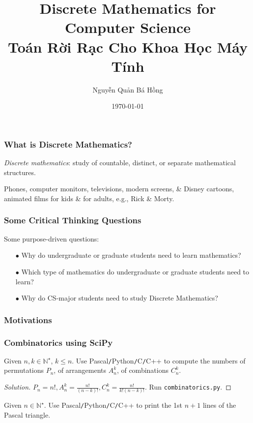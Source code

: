 \documentclass{beamer}
\title{Discrete Mathematics for Computer Science\\Toán Rời Rạc Cho Khoa Học Máy Tính}
\author{Nguyễn Quản Bá Hồng}
\institute{Presented at University of Management \& Technology of HCMC (UMT)}
\date{\today}
\begin{document}
\frame{\titlepage}

\begin{frame}
	\frametitle{What is Discrete Mathematics?}
	
	\begin{definition}
		\emph{Discrete mathematics}: study of countable, distinct, or separate mathematical structures.
	\end{definition}
	
	\begin{example}[Pixel]
		Phones, computer monitors, televisions, modern screens, \& Disney cartoons, animated films for kids \& for adults, e.g., Rick \& Morty.
	\end{example}
	
\end{frame}

\begin{frame}
	\frametitle{Some Critical Thinking Questions}
	Some purpose-driven questions:
	\begin{itemize}\it
		\item[$\bullet$] Why do undergraduate or graduate students need to learn mathematics?
		\item[$\bullet$] Which type of mathematics do undergraduate or graduate students need to learn?
		\item[$\bullet$] Why do CS-major students need to study Discrete Mathematics?
	\end{itemize}
\end{frame}

\begin{frame}
	\frametitle{Motivations}
	
	
\end{frame}

\begin{frame}
	\frametitle{Combinatorics using SciPy}
	\begin{problem}
		Given $n,k\in\mathbb{N}^\star$, $k\le n$. Use {\sf Pascal{\tt/}Python{\tt/}C{\tt/}C++} to compute the numbers of permutations $P_n$, of arrangements $A_n^k$, of combinations $C_n^k$.
	\end{problem}
	
	\begin{proof}[Solution]
		$P_n = n!,A_n^k = \frac{n!}{(n - k)!},C_n^k = \frac{n!}{k!(n - k)!}$. Run {\tt combinatorics.py}.		
	\end{proof}
	
	\begin{problem}
		Given $n\in\mathbb{N}^\star$. Use {\sf Pascal{\tt/}Python{\tt/}C{\tt/}C++} to print the 1st $n + 1$ lines of the Pascal triangle.
	\end{problem}
\end{frame}
\end{document}
